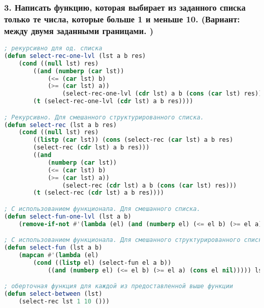 \subsubsection*{3. Написать функцию, которая выбирает из заданного списка только те числа, которые больше 1 и меньше 10. (Вариант: между двумя заданными границами. )}
\begin{lstlisting}[language=Lisp]
; рекурсивно для од. списка
(defun select-rec-one-lvl (lst a b res)
	(cond ((null lst) res)
		((and (numberp (car lst)) 
			(<= (car lst) b) 
			(>= (car lst) a)) 
				(select-rec-one-lvl (cdr lst) a b (cons (car lst) res)))
		(t (select-rec-one-lvl (cdr lst) a b res))))

; Рекурсивно. Для смешанного структурированного списка.
(defun select-rec (lst a b res)
	(cond ((null lst) res)
		((listp (car lst)) (cons (select-rec (car lst) a b res)
		(select-rec (cdr lst) a b res)))
		((and
			(numberp (car lst))
			(<= (car lst) b) 
			(>= (car lst) a)) 
				(select-rec (cdr lst) a b (cons (car lst) res)))
		(t (select-rec (cdr lst) a b res))))

; С использованием функционала. Для смешанного списка.
(defun select-fun-one-lvl (lst a b)
	(remove-if-not #'(lambda (el) (and (numberp el) (<= el b) (>= el a))) lst))

; С использованием функционала. Для смешанного структурированного списка.
(defun select-fun (lst a b)
	(mapcan #'(lambda (el) 
		(cond ((listp el) (select-fun el a b))
			((and (numberp el) (<= el b) (>= el a) (cons el nil))))) lst))

; оберточная функция для каждой из предоставленной выше функции
(defun select-between (lst)
	(select-rec lst 1 10 ()))
\end{lstlisting}

